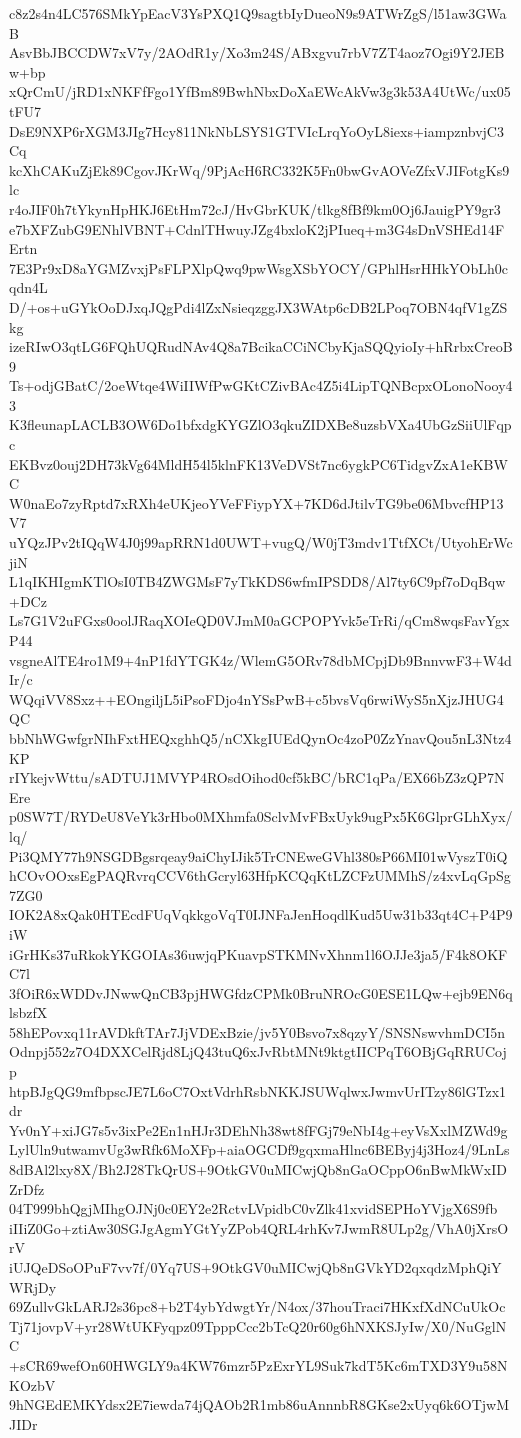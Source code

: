 c8z2s4n4LC576SMkYpEacV3YsPXQ1Q9sagtbIyDueoN9s9ATWrZgS/l51aw3GWaB
AsvBbJBCCDW7xV7y/2AOdR1y/Xo3m24S/ABxgvu7rbV7ZT4aoz7Ogi9Y2JEBw+bp
xQrCmU/jRD1xNKFfFgo1YfBm89BwhNbxDoXaEWcAkVw3g3k53A4UtWc/ux05tFU7
DsE9NXP6rXGM3JIg7Hcy811NkNbLSYS1GTVIcLrqYoOyL8iexs+iampznbvjC3Cq
kcXhCAKuZjEk89CgovJKrWq/9PjAcH6RC332K5Fn0bwGvAOVeZfxVJIFotgKs9lc
r4oJIF0h7tYkynHpHKJ6EtHm72cJ/HvGbrKUK/tlkg8fBf9km0Oj6JauigPY9gr3
e7bXFZubG9ENhlVBNT+CdnlTHwuyJZg4bxloK2jPIueq+m3G4sDnVSHEd14FErtn
7E3Pr9xD8aYGMZvxjPsFLPXlpQwq9pwWsgXSbYOCY/GPhlHsrHHkYObLh0cqdn4L
D/+os+uGYkOoDJxqJQgPdi4lZxNsieqzggJX3WAtp6cDB2LPoq7OBN4qfV1gZSkg
izeRIwO3qtLG6FQhUQRudNAv4Q8a7BcikaCCiNCbyKjaSQQyioIy+hRrbxCreoB9
Ts+odjGBatC/2oeWtqe4WiIIWfPwGKtCZivBAc4Z5i4LipTQNBcpxOLonoNooy43
K3fleunapLACLB3OW6Do1bfxdgKYGZlO3qkuZIDXBe8uzsbVXa4UbGzSiiUlFqpc
EKBvz0ouj2DH73kVg64MldH54l5klnFK13VeDVSt7nc6ygkPC6TidgvZxA1eKBWC
W0naEo7zyRptd7xRXh4eUKjeoYVeFFiypYX+7KD6dJtilvTG9be06MbvcfHP13V7
uYQzJPv2tIQqW4J0j99apRRN1d0UWT+vugQ/W0jT3mdv1TtfXCt/UtyohErWcjiN
L1qIKHIgmKTlOsI0TB4ZWGMsF7yTkKDS6wfmIPSDD8/Al7ty6C9pf7oDqBqw+DCz
Ls7G1V2uFGxs0oolJRaqXOIeQD0VJmM0aGCPOPYvk5eTrRi/qCm8wqsFavYgxP44
vsgneAlTE4ro1M9+4nP1fdYTGK4z/WlemG5ORv78dbMCpjDb9BnnvwF3+W4dIr/c
WQqiVV8Sxz++EOngiljL5iPsoFDjo4nYSsPwB+c5bvsVq6rwiWyS5nXjzJHUG4QC
bbNhWGwfgrNIhFxtHEQxghhQ5/nCXkgIUEdQynOc4zoP0ZzYnavQou5nL3Ntz4KP
rIYkejvWttu/sADTUJ1MVYP4ROsdOihod0cf5kBC/bRC1qPa/EX66bZ3zQP7NEre
p0SW7T/RYDeU8VeYk3rHbo0MXhmfa0SclvMvFBxUyk9ugPx5K6GlprGLhXyx/lq/
Pi3QMY77h9NSGDBgsrqeay9aiChyIJik5TrCNEweGVhl380sP66MI01wVyszT0iQ
hCOvOOxsEgPAQRvrqCCV6thGcryl63HfpKCQqKtLZCFzUMMhS/z4xvLqGpSg7ZG0
IOK2A8xQak0HTEcdFUqVqkkgoVqT0IJNFaJenHoqdlKud5Uw31b33qt4C+P4P9iW
iGrHKs37uRkokYKGOIAs36uwjqPKuavpSTKMNvXhnm1l6OJJe3ja5/F4k8OKFC7l
3fOiR6xWDDvJNwwQnCB3pjHWGfdzCPMk0BruNROcG0ESE1LQw+ejb9EN6qlsbzfX
58hEPovxq11rAVDkftTAr7JjVDExBzie/jv5Y0Bsvo7x8qzyY/SNSNswvhmDCI5n
Odnpj552z7O4DXXCelRjd8LjQ43tuQ6xJvRbtMNt9ktgtIICPqT6OBjGqRRUCojp
htpBJgQG9mfbpscJE7L6oC7OxtVdrhRsbNKKJSUWqlwxJwmvUrITzy86lGTzx1dr
Yv0nY+xiJG7s5v3ixPe2En1nHJr3DEhNh38wt8fFGj79eNbI4g+eyVsXxlMZWd9g
LylUln9utwamvUg3wRfk6MoXFp+aiaOGCDf9gqxmaHlnc6BEByj4j3Hoz4/9LnLs
8dBAl2lxy8X/Bh2J28TkQrUS+9OtkGV0uMICwjQb8nGaOCppO6nBwMkWxIDZrDfz
04T999bhQgjMIhgOJNj0c0EY2e2RctvLVpidbC0vZlk41xvidSEPHoYVjgX6S9fb
iIIiZ0Go+ztiAw30SGJgAgmYGtYyZPob4QRL4rhKv7JwmR8ULp2g/VhA0jXrsOrV
iUJQeDSoOPuF7vv7f/0Yq7US+9OtkGV0uMICwjQb8nGVkYD2qxqdzMphQiYWRjDy
69ZullvGkLARJ2s36pc8+b2T4ybYdwgtYr/N4ox/37houTraci7HKxfXdNCuUkOc
Tj71jovpV+yr28WtUKFyqpz09TpppCcc2bTcQ20r60g6hNXKSJyIw/X0/NuGglNC
+sCR69wefOn60HWGLY9a4KW76mzr5PzExrYL9Suk7kdT5Kc6mTXD3Y9u58NKOzbV
9hNGEdEMKYdsx2E7iewda74jQAOb2R1mb86uAnnnbR8GKse2xUyq6k6OTjwMJIDr
